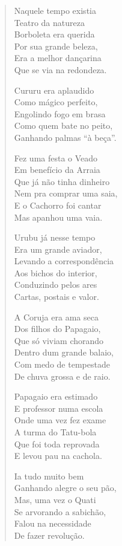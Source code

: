\begin{verse}
Naquele tempo existia\\
Teatro da natureza\\
Borboleta era querida\\
Por sua grande beleza,\\
Era a melhor dançarina\\
Que se via na redondeza.


Cururu era aplaudido\\
Como mágico perfeito,\\
Engolindo fogo em brasa\\
Como quem bate no peito,\\
Ganhando palmas “à beça”.

Fez uma festa o Veado\\
Em benefício da Arraia\\
Que já não tinha dinheiro\\
Nem pra comprar uma saia,\\
E o Cachorro foi cantar\\
Mas apanhou uma vaia.

Urubu já nesse tempo\\
Era um grande aviador,\\
Levando a correspondência\\
Aos bichos do interior,\\
Conduzindo pelos ares\\
Cartas, postais e valor.

A Coruja era ama seca\\
Dos filhos do Papagaio,\\
Que só viviam chorando\\
Dentro dum grande balaio,\\
Com medo de tempestade\\
De chuva grossa e de raio.


Papagaio era estimado\\
E professor numa escola\\
Onde uma vez fez exame\\
A turma do Tatu-bola\\
Que foi toda reprovada\\
E levou pau na cachola.

Ia tudo muito bem\\
Ganhando alegre o seu pão,\\
Mas, uma vez o Quati\\
Se arvorando a sabichão,\\
Falou na necessidade\\
De fazer revolução.


\end{verse}
